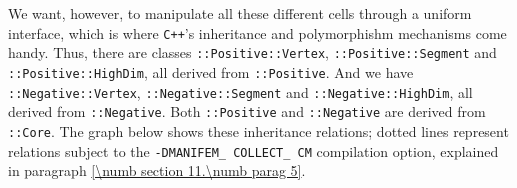 We want, however, to manipulate all these different cells through a uniform interface,
which is where {\tt C++}'s inheritance and polymorphishm mechanisms come handy.
Thus, there are classes {\small\tt{}::Positive::Vertex},
{\small\tt{}::Positive::Segment} and {\small\tt{}::Positive::HighDim},
all derived from {\small\tt{}::Positive}.
And we have {\small\tt{}::Negative::Vertex},
{\small\tt{}::Negative::Segment} and {\small\tt{}::Negative::HighDim},
all derived from {\small\tt{}::Negative}.
Both {\small\tt{}::Positive} and {\small\tt{}::Negative} are derived from
{\small\tt{}::Core}.
The graph below shows these inheritance relations; dotted lines represent relations subject to
the {\small\tt -DMANIFEM\_\,COLLECT\_\,CM} compilation option, explained in paragraph
\ref{\numb section 11.\numb parag 5}.

